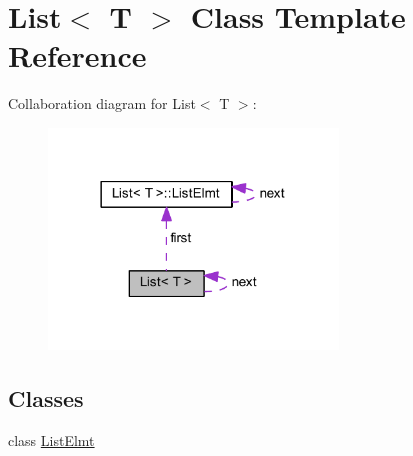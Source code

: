 \hypertarget{class_list}{}\section{List$<$ T $>$ Class Template Reference}
\label{class_list}


Collaboration diagram for List$<$ T $>$\+:\nopagebreak
\begin{figure}[H]
\begin{center}
\leavevmode
\includegraphics[width=218pt]{class_list__coll__graph}
\end{center}
\end{figure}
\subsection*{Classes}
\begin{DoxyCompactItemize}
\item 
class \mbox{\hyperlink{class_list_1_1_list_elmt}{List\+Elmt}}
\end{DoxyCompactItemize}
